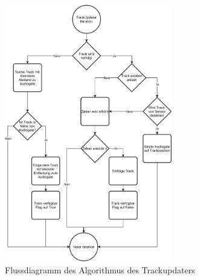 \begin{figure}[ht]
    \centering
    \includegraphics[width=0.65\textwidth]{content/assets/TrackUpdaterSTT.png}
    \caption{Flussdiagramm des Algorithmus des Trackupdaters}
\end{figure}
